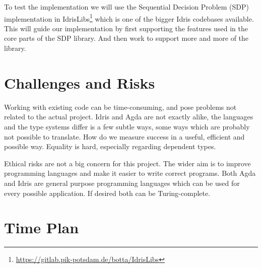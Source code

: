 \documentclass[parskip=half]{scrartcl}
\begin{document}
To test the implementation we will use the Sequential Decision Problem (SDP)
implementation in
IdrisLibs\footnote{\url{https://gitlab.pik-potsdam.de/botta/IdrisLibs}} which
is one of the bigger Idris codebases available. This will guide our
implementation by first supporting the features used in the core parts of the
SDP library. And then work to support more and more of the library.


\section{Challenges and Risks}
Working with existing code can be time-consuming, and pose problems not related
to the actual project.  Idris and Agda are not exactly alike, the languages and
the type systems differ is a few subtle ways, some ways which are probably not
possible to translate.  How do we measure success in a useful, efficient and
possible way. Equality is hard, especially regarding dependent types.

Ethical risks are not a big concern for this project. The wider aim is to
improve programming languages and make it easier to write correct programs.
Both Agda and Idris are general purpose programming languages which can be
used for every possible application. If desired both can be Turing-complete.



\section{Time Plan}
\end{document}
